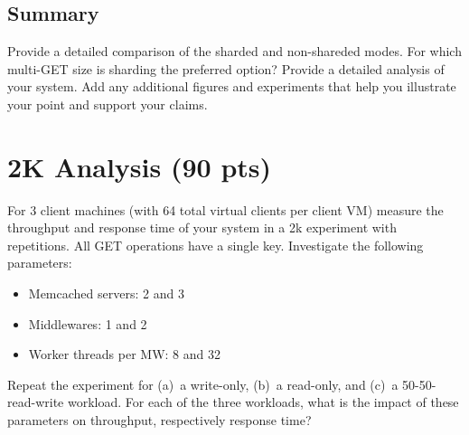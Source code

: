 \documentclass[11pt,a4paper]{article}
\begin{document}
\subsection{Summary}

Provide a detailed comparison of the sharded and non-shareded modes. For which multi-GET size is sharding the preferred option? Provide a detailed analysis of your system. Add any additional figures and experiments that help you illustrate your point and support your claims.

\section{2K Analysis (90 pts)}

For 3 client machines (with 64 total virtual clients per client VM) measure the throughput and response time of your system in a 2k experiment with repetitions. All GET operations have a single key. Investigate the following parameters:

\begin{itemize}
		
	\item Memcached servers: 2 and 3
	\item Middlewares: 1 and 2
	\item Worker threads per MW: 8 and 32
	      	      
\end{itemize}

Repeat the experiment for (a)~a write-only, (b)~a read-only, and (c)~a 50-50-read-write workload.
For each of the three workloads, what is the impact of these parameters on throughput, respectively response time?
\end{document}

